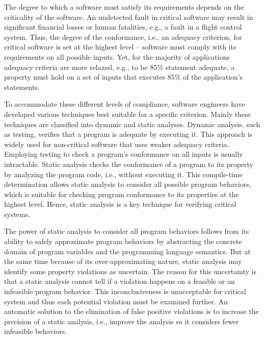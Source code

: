 The degree to which a software must satisfy its requirements depends on the criticality of the software. An undetected fault in critical software may result in significant financial losses or human fatalities, e.g., a fault in a flight control system. Thus, the degree of the conformance, i.e., an adequacy criterion,  for critical software is set at the highest level -- software must comply with its requirements on all possible inputs. Yet, for the majority of applications adequacy criteria are more relaxed, e.g., to be $85\%$ statement adequate, a property must hold on a set of inputs that executes $85\%$ of the application's statements. 

To accommodate these different levels of compliance, software engineers have developed various techniques best suitable for a specific criterion. Mainly these techniques are classified into dynamic and static analyses. Dynamic analysis, such as testing, verifies that a program is adequate by executing it. This approach is widely used for non-critical software that uses weaker adequacy criteria. Employing testing to check a program's conformance on all inputs is usually intractable. Static analysis checks the conformance of a program to its property by analyzing the program code, i.e., without executing it. This compile-time determination allows static analysis to consider all possible program behaviors, which is suitable for checking program conformance to its properties at the highest level. Hence, static analysis is a key technique for verifying critical systems.
 
The power of static analysis to consider all program behaviors follows from its ability to safely approximate program behaviors by abstracting the concrete domain of program variables and the programming language semantics. But at the same time because of its over-approximating nature, static analysis may identify some property violations as uncertain. The reason for this uncertainty is that a static analysis cannot tell if a violation happens on a feasible or an infeasible program behavior. This inconclusiveness is unacceptable for critical system and thus each potential violation must be examined further. An automatic solution to the elimination of false positive violations is to increase the precision of a static analysis, i.e., improve the analysis so it considers fewer infeasible behaviors.

